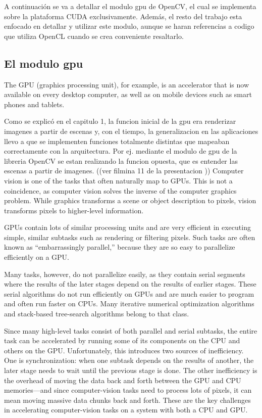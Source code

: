 \documentclass[a4paper,10pt]{report}
\begin{document}
A continuación se va a detallar el modulo gpu de OpenCV, el cual se implementa sobre la plataforma CUDA exclusivamente. Además, el resto del trabajo esta enfocado en detallar y utilizar
este modulo, aunque se haran referencias a codigo que utiliza OpenCL cuando se crea conveniente resaltarlo.


\subsection{El modulo gpu}


The GPU (graphics processing unit), for example, is an accelerator that is now available on every desktop computer, as well as on mobile devices such as smart phones and tablets.

Como se explicó en el capitulo 1, la funcion inicial de la gpu era renderizar imagenes a partir de escenas y,
con el tiempo, la generalizacion en las aplicaciones llevo a que se implementen funciones totalmente distintas que mapeaban correctamente con la arquitectura. 
Por ej. mediante el modulo de gpu de la libreria OpenCV se estan realizando la funcion opuesta, que es entender las escenas a partir de imagenes. ((ver filmina 11 de la presentacion ))
Computer vision is one of the tasks that often naturally map to GPUs. This is not a coincidence, as computer vision solves the inverse of the computer graphics problem.
While graphics transforms a scene or object description to pixels, vision transforms pixels to higher-level information.


GPUs contain lots of similar processing units and are very efficient in executing simple, similar subtasks such as rendering or filtering pixels. 
Such tasks are often known as “embarrassingly parallel,” because they are so easy to parallelize efficiently on a GPU.

Many tasks, however, do not parallelize easily, as they contain serial segments where the results of the later stages depend on the results of earlier stages. 
These serial algorithms do not run efficiently on GPUs and are much easier to program and often run faster on CPUs. Many iterative numerical optimization algorithms and stack-based tree-search algorithms belong to that class.

Since many high-level tasks consist of both parallel and serial subtasks, the entire task can be accelerated by running some of its components on the CPU and others on the GPU. 
Unfortunately, this introduces two sources of inefficiency. 
One is synchronization: when one subtask depends on the results of another, the later stage needs to wait until the previous stage is done. 
The other inefficiency is the overhead of moving the data back and forth between the GPU and CPU memories—and since computer-vision tasks need to process lots of pixels, it can mean moving massive data chunks back and forth. These are the key challenges in accelerating computer-vision tasks on a system with both a CPU and GPU.
\end{document}
